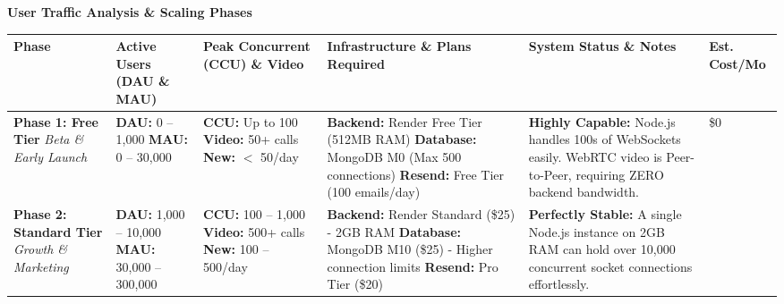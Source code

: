 \documentclass[11pt,a4paper]{article}
\begin{document}
\begin{center}
    \Huge\textbf{User Traffic Analysis \& Scaling Phases}
\end{center}

\vspace{0.5cm}

\renewcommand{\arraystretch}{1.5}
\noindent
\begin{tabularx}{\textwidth}{@{} 
    >{\hsize=0.8\hsize\raggedright\arraybackslash}X 
    >{\hsize=0.6\hsize\raggedright\arraybackslash}X 
    >{\hsize=0.8\hsize\raggedright\arraybackslash}X 
    >{\hsize=1.6\hsize\raggedright\arraybackslash}X 
    >{\hsize=1.6\hsize\raggedright\arraybackslash}X 
    >{\hsize=0.6\hsize\raggedright\arraybackslash}X @{}}
\toprule
\textbf{Phase} & \textbf{Active Users (DAU \& MAU)} & \textbf{Peak Concurrent (CCU) \& Video} & \textbf{Infrastructure \& Plans Required} & \textbf{System Status \& Notes} & \textbf{Est. Cost/Mo} \\
\midrule
\textbf{Phase 1: Free Tier} \newline \textit{Beta \& Early Launch} 
& \textbf{DAU:} 0 -- 1,000 \newline \textbf{MAU:} 0 -- 30,000
& \textbf{CCU:} Up to 100 \newline \textbf{Video:} 50+ calls \newline \textbf{New:} $<$ 50/day
& \textbf{Backend:} Render Free Tier (512MB RAM) \newline \textbf{Database:} MongoDB M0 (Max 500 connections) \newline \textbf{Resend:} Free Tier (100 emails/day)
& \textcolor{green!70!black}{\textbf{Highly Capable:}} Node.js handles 100s of WebSockets easily. WebRTC video is Peer-to-Peer, requiring ZERO backend bandwidth.
& \$0 \\
\midrule
\textbf{Phase 2: Standard Tier} \newline \textit{Growth \& Marketing}
& \textbf{DAU:} 1,000 -- 10,000 \newline \textbf{MAU:} 30,000 -- 300,000
& \textbf{CCU:} 100 -- 1,000 \newline \textbf{Video:} 500+ calls \newline \textbf{New:} 100 -- 500/day
& \textbf{Backend:} Render Standard (\$25) - 2GB RAM \newline \textbf{Database:} MongoDB M10 (\$25) - Higher connection limits \newline \textbf{Resend:} Pro Tier (\$20)
& \textcolor{green!70!black}{\textbf{Perfectly Stable:}} A single Node.js instance on 2GB RAM can hold over 10,000 concurrent socket connections effortlessly.

\end{tabularx}
\end{document}
